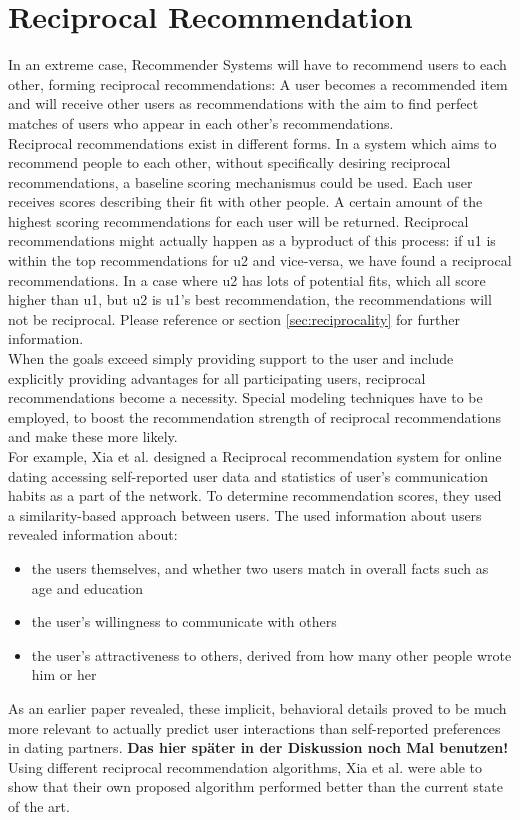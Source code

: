 \documentclass[nochapterpage,bigchapter,linedtoc,longdoc,colorback,accentcolor=tud3b,oneside]{tudreport}
\begin{document}
\section{Reciprocal Recommendation}
In an extreme case, Recommender Systems will have to recommend users to each other, forming reciprocal recommendations: A user becomes a recommended item and will receive other users as recommendations with the aim to find perfect matches of users who appear in each other's recommendations.\\
Reciprocal recommendations exist in different forms. In a system which aims to recommend people to each other, without specifically desiring reciprocal recommendations, a baseline scoring mechanismus could be used. Each user receives scores describing their fit with other people. A certain amount of the highest scoring recommendations for each user will be returned. Reciprocal recommendations might actually happen as a byproduct of this process: if u1 is within the top recommendations for u2 and vice-versa, we have found a reciprocal recommendations. In a case where u2 has lots of potential fits, which all score higher than u1, but u2 is u1's best recommendation, the recommendations will not be reciprocal. Please reference \cite{potts2018reciprocal} or section \ref{sec:reciprocality} for further information.\\
When the goals exceed simply providing support to the user and include explicitly providing advantages for all participating users, reciprocal recommendations become a necessity. Special modeling techniques have to be employed, to boost the recommendation strength of reciprocal recommendations and make these more likely.\\
For example, Xia et al. designed a Reciprocal recommendation system for online dating \cite{xia2015reciprocal} accessing self-reported user data and statistics of user's communication habits as a part of the network. To determine recommendation scores, they used a similarity-based approach between users. The used information about users revealed information about:
\begin{itemize}
	\item the users themselves, and whether two users match in overall facts such as age and education
	\item the user's willingness to communicate with others
	\item the user's attractiveness to others, derived from how many other people wrote him or her
\end{itemize}
As an earlier paper revealed, these implicit, behavioral details proved to be much more relevant to actually predict user interactions than self-reported preferences in dating partners. \cite{xia2014characterization} \textbf{Das hier später in der Diskussion noch Mal benutzen!}\\
Using different reciprocal recommendation algorithms, Xia et al. were able to show that their own proposed algorithm performed better than the current state of the art. \cite{xia2015reciprocal}\\
\end{document}
